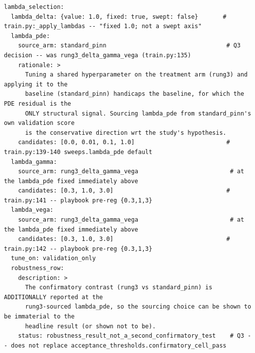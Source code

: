 \documentclass{article}
\begin{document}
\begin{lstlisting}[basicstyle=\ttfamily\tiny,breaklines=true,breakatwhitespace=true,keepspaces=true,columns=fullflexible,postbreak=\mbox{$\hookrightarrow$\space},breakindent=1.5em]
lambda_selection:
  lambda_delta: {value: 1.0, fixed: true, swept: false}       # train.py:_apply_lambdas -- "fixed 1.0; not a swept axis"
  lambda_pde:
    source_arm: standard_pinn                                  # Q3 decision -- was rung3_delta_gamma_vega (train.py:135)
    rationale: >
      Tuning a shared hyperparameter on the treatment arm (rung3) and applying it to the
      baseline (standard_pinn) handicaps the baseline, for which the PDE residual is the
      ONLY structural signal. Sourcing lambda_pde from standard_pinn's own validation score
      is the conservative direction wrt the study's hypothesis.
    candidates: [0.0, 0.01, 0.1, 1.0]                          # train.py:139-140 sweeps.lambda_pde default
  lambda_gamma:
    source_arm: rung3_delta_gamma_vega                          # at the lambda_pde fixed immediately above
    candidates: [0.3, 1.0, 3.0]                                # train.py:141 -- playbook pre-reg {0.3,1,3}
  lambda_vega:
    source_arm: rung3_delta_gamma_vega                          # at the lambda_pde fixed immediately above
    candidates: [0.3, 1.0, 3.0]                                # train.py:142 -- playbook pre-reg {0.3,1,3}
  tune_on: validation_only
  robustness_row:
    description: >
      The confirmatory contrast (rung3 vs standard_pinn) is ADDITIONALLY reported at the
      rung3-sourced lambda_pde, so the sourcing choice can be shown to be immaterial to the
      headline result (or shown not to be).
    status: robustness_result_not_a_second_confirmatory_test    # Q3 -- does not replace acceptance_thresholds.confirmatory_cell_pass
\end{lstlisting}
\end{document}
